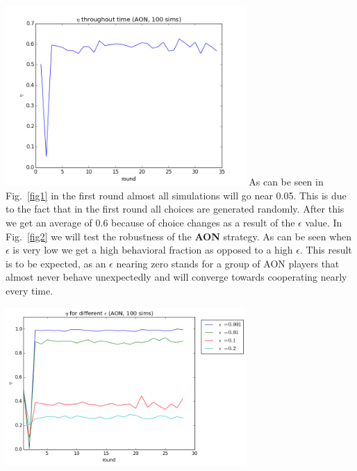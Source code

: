 \documentclass[letterpaper]{article}
\begin{document}
\includegraphics[width=3.6in,angle=0]{img/cfraction_aon.png}
\label{fig1}
As can be seen in Fig.~\ref{fig1} in the first round almost all simulations will go near 0.05. This is due to the fact that in the first round all choices are generated randomly. After this we get an average of 0.6 because of choice changes as a result of the $\epsilon$  value.
In Fig.~\ref{fig2} we will test the robustness of the \textbf{AON} strategy. As can be seen when $\epsilon$ is very low we get a high behavioral fraction as opposed to a high $\epsilon$. This result is to be expected, as an $\epsilon$ nearing zero stands for a group of AON players that almost never behave unexpectedly and will converge towards cooperating nearly every time.


\includegraphics[width=3.6in,angle=0]{img/cfraction_epsilon_aon.png}
\label{fig2}


\end{document}
